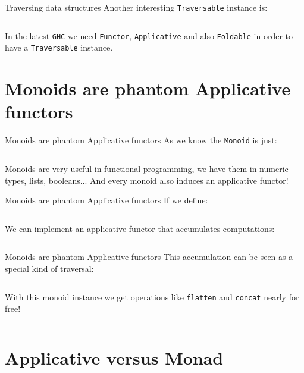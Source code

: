 \documentclass[10pt]{beamer}
\begin{document}
\begin{frame}{Traversing data structures}
  Another interesting \verb~Traversable~ instance is:

  \inputminted{haskell}{../src/Traversable_tree.hs}

  In the latest \verb~GHC~ we need \verb~Functor~, \verb~Applicative~
  and also \verb~Foldable~ in order to have a \verb~Traversable~
  instance.
\end{frame}

\section{Monoids are phantom Applicative functors}

\begin{frame}{Monoids are phantom Applicative functors}
  As we know the \verb~Monoid~ is just:

  \inputminted{haskell}{../src/Monoid.hs}

  Monoids are very useful in functional programming, we have them in
  numeric types, lists, booleans... And every monoid also induces an
  applicative functor!

\end{frame}

\begin{frame}{Monoids are phantom Applicative functors}
  If we define:

  \inputminted{haskell}{../src/Accy.hs}

  We can implement an applicative functor that accumulates
  computations:

  \inputminted{haskell}{../src/Monoid_applicative.hs}
\end{frame}

\begin{frame}{Monoids are phantom Applicative functors}
  This accumulation can be seen as a special kind of traversal:

  \inputminted{haskell}{../src/acc_red.hs}

  With this monoid instance we get operations like \verb~flatten~ and
  \verb~concat~ nearly for free!

  \inputminted{haskell}{../src/flatten_concat_monoid.hs}
\end{frame}

\section{Applicative versus Monad}
\end{document}
